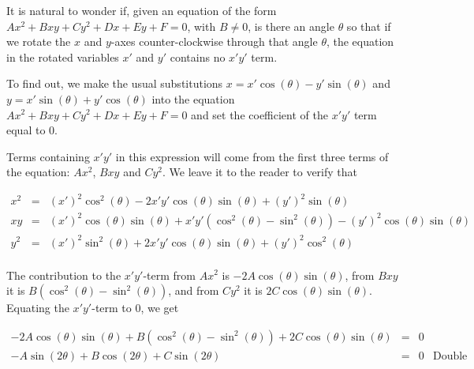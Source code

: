 \documentclass{ximera}
\begin{document}
{\smallskip
	
 It is natural to wonder if, given an equation of the form $Ax^2 + Bxy +Cy^2 + Dx + Ey + F = 0$, with $B \neq 0$, is there an angle $\theta$ so that if we rotate the $x$ and $y$-axes counter-clockwise through that angle $\theta$, the equation in the rotated  variables $x'$ and $y'$ contains no $x'y'$ term.
 
 \smallskip
 
  To find out, we make the usual substitutions  $x = x' \cos(\theta) - y' \sin(\theta)$ and  $y =  x'\sin(\theta) + y'\cos(\theta)$ into the equation $Ax^2 + Bxy +Cy^2 + Dx + Ey + F = 0$ and set the coefficient of the $x'y'$ term equal to $0$.  
  
  \smallskip
  
  Terms containing $x'y'$ in this expression will come from the first three terms of the equation: $Ax^2$, $Bxy$ and $Cy^2$.  We leave it to the reader to verify that 

\[ \begin{array}{rcl}



x^2 & = &(x')^2 \cos^{2}(\theta) - 2x'y'\cos(\theta) \sin(\theta) + (y')^2 \sin(\theta) \\ [3pt]


xy & = &  (x')^2\cos(\theta) \sin(\theta)+ x'y' \left(\cos^{2}(\theta)-\sin^2(\theta)\right)-(y')^2\cos(\theta)\sin(\theta) \\ [3pt]


y^2 & = & (x')^2 \sin^{2}(\theta) +2x'y' \cos(\theta) \sin(\theta) +(y')^2 \cos^{2}(\theta) \\

\end{array} \]

The contribution to the $x'y'$-term from $Ax^2$ is $-2A\cos(\theta) \sin(\theta)$, from $Bxy$ it is $B \left(\cos^{2}(\theta)-\sin^2(\theta)\right)$, and from $Cy^2$ it is $2C \cos(\theta) \sin(\theta)$.  Equating the $x'y'$-term to $0$, we get

\[ \begin{array}{rcll}

-2A\cos(\theta) \sin(\theta) + B \left(\cos^{2}(\theta)-\sin^2(\theta)\right) + 2C \cos(\theta) \sin(\theta) & = & 0 & \\ [3pt]
-A \sin(2\theta) + B \cos(2\theta) + C \sin(2\theta) & = & 0 & \text{Double Angle Identities} \\ [3pt]
\end{array} \]

}
\end{document}
